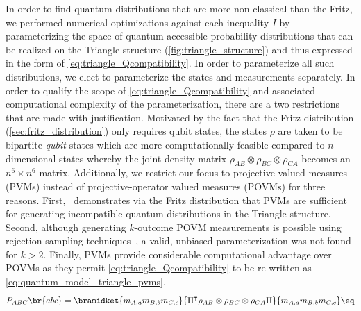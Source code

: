 \documentclass[aps, 10pt, english, twoside, pra, nofootinbib, tightenlines, longbibliography, superscriptaddress]{revtex4-1}
\begin{document}





    In order to find quantum distributions that are more non-classical than the Fritz, we performed numerical optimizations against each inequality $I$ by parameterizing the space of quantum-accessible probability distributions that can be realized on the Triangle structure (\cref{fig:triangle_structure}) and thus expressed in the form of \cref{eq:triangle_Qcompatibility}. In order to parameterize all such distributions, we elect to parameterize the states and measurements separately. In order to qualify the scope of \cref{eq:triangle_Qcompatibility} and associated computational complexity of the parameterization, there are a two restrictions that are made with justification. Motivated by the fact that the Fritz distribution (\cref{sec:fritz_distribution}) only requires qubit states, the states $\rho$ are taken to be bipartite \textit{qubit} states which are more computationally feasible compared to $n$-dimensional states whereby the joint density matrix $\rho_{AB}\otimes\rho_{BC}\otimes\rho_{CA}$ becomes an $n^6 \times n^6$ matrix. Additionally, we restrict our focus to projective-valued measures (PVMs) instead of projective-operator valued measures (POVMs) for three reasons. First,~\citet{Fritz_2012} demonstrates via the Fritz distribution that PVMs are sufficient for generating incompatible quantum distributions in the Triangle structure. Second, although generating $k$-outcome POVM measurements is possible using rejection sampling techniques~\cite{Petz_2015}, a valid, unbiased parameterization was not found for $k > 2$. Finally, PVMs provide considerable computational advantage over POVMs as they permit \cref{eq:triangle_Qcompatibility} to be re-written as \cref{eq:quantum_model_triangle_pvms}.
    \[ \prob[ABC]\br{abc} = \bramidket{m_{A,a}m_{B,b}m_{C,c}}{\netperm^\intercal \rho_{AB}\otimes\rho_{BC}\otimes\rho_{CA} \netperm}{m_{A,a}m_{B,b}m_{C,c}} \eq \label{eq:quantum_model_triangle_pvms}\]
\end{document}
